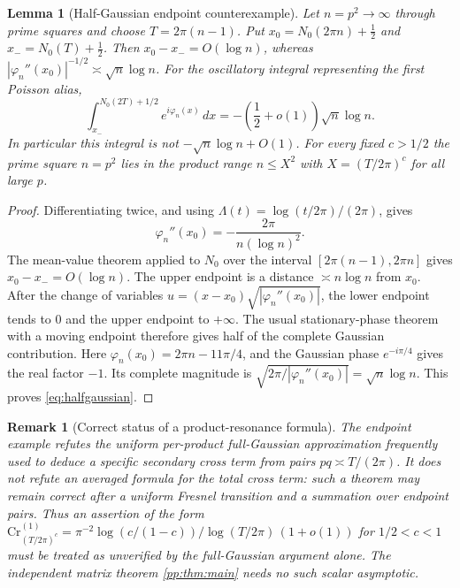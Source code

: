 \documentclass[11pt,reqno]{amsart}
\numberwithin{equation}{section}
\newtheorem{lemma}[theorem]{Lemma}
\newtheorem{remark}[theorem]{Remark}
\newcommand{\lamb}{\Lambda}
\begin{document}
\begin{lemma}[Half-Gaussian endpoint counterexample]
\label{lem:endpointfresnel}
Let $n=p^2\to\infty$ through prime squares and choose
$T=2\pi(n-1)$. Put $x_0=N_0(2\pi n)+\frac12$ and
$x_-=N_0(T)+\frac12$. Then $x_0-x_-=O(\log n)$, whereas
$|\varphi_n''(x_0)|^{-1/2}\asymp\sqrt n\log n$.
For the oscillatory integral representing the first Poisson alias,
\begin{equation}\label{eq:halfgaussian}
\int_{x_-}^{N_0(2T)+1/2}e^{i\varphi_n(x)}\,dx
= -\left(\frac12+o(1)\right)\sqrt n\log n.
\end{equation}
In particular this integral is \emph{not}
$-\sqrt n\log n+O(1)$. For every fixed $c>1/2$ the
prime square $n=p^2$ lies in the product range
$n\le X^2$ with $X=(T/2\pi)^c$ for all large $p$.
\end{lemma}
\begin{proof}
Differentiating twice, and using
$\lamb(t)=\log(t/2\pi)/(2\pi)$, gives
\[
\varphi_n''(x_0)=-\frac{2\pi}{n(\log n)^2}.
\]
The mean-value theorem applied to $N_0$ over the interval
$[2\pi(n-1),2\pi n]$ gives $x_0-x_-=O(\log n)$.
The upper endpoint is a distance $\asymp n\log n$ from $x_0$.
After the change of variables
$u=(x-x_0)\sqrt{|\varphi_n''(x_0)|}$,
the lower endpoint tends to $0$ and the upper endpoint to
$+\infty$. The usual stationary-phase theorem with a moving
endpoint therefore gives half of the complete Gaussian
contribution. Here
$\varphi_n(x_0)=2\pi n-11\pi/4$, and the Gaussian phase
$e^{-i\pi/4}$ gives the real factor $-1$. Its complete magnitude is
$\sqrt{2\pi/|\varphi_n''(x_0)|}=\sqrt n\log n$.
This proves \eqref{eq:halfgaussian}.
\end{proof}
\begin{remark}[Correct status of a product-resonance formula]
The endpoint example refutes the \emph{uniform per-product}
full-Gaussian approximation frequently used to deduce a specific
secondary cross term from pairs $pq\asymp T/(2\pi)$. It does
\emph{not} refute an averaged formula for the total cross term:
such a theorem may remain correct after a uniform Fresnel transition
and a summation over endpoint pairs. Thus an assertion of the form
$\mathrm{Cr}^{(1)}_{(T/2\pi)^c}
=\pi^{-2}\log(c/(1-c))/\log(T/2\pi)\,(1+o(1))$
for $1/2<c<1$ must be treated as unverified by the full-Gaussian
argument alone. The independent matrix theorem
\cref{pp:thm:main} needs no such scalar asymptotic.
\end{remark}
\end{document}
